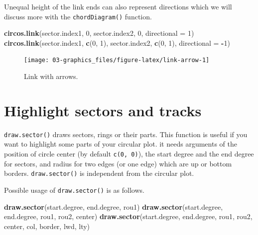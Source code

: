 \documentclass[]{book}
\newenvironment{Shaded}{\begin{snugshade}}{\end{snugshade}}
\newcommand{\KeywordTok}[1]{\textcolor[rgb]{0.13,0.29,0.53}{\textbf{#1}}}
\newcommand{\DataTypeTok}[1]{\textcolor[rgb]{0.13,0.29,0.53}{#1}}
\newcommand{\DecValTok}[1]{\textcolor[rgb]{0.00,0.00,0.81}{#1}}
\newcommand{\OperatorTok}[1]{\textcolor[rgb]{0.81,0.36,0.00}{\textbf{#1}}}
\newcommand{\NormalTok}[1]{#1}
\begin{document}
Unequal height of the link ends can also represent directions which we
will discuss more with the \texttt{chordDiagram()} function.

\begin{Shaded}
\begin{Highlighting}[]
\KeywordTok{circos.link}\NormalTok{(sector.index1, }\DecValTok{0}\NormalTok{, sector.index2, }\DecValTok{0}\NormalTok{, }\DataTypeTok{directional =} \DecValTok{1}\NormalTok{)}
\KeywordTok{circos.link}\NormalTok{(sector.index1, }\KeywordTok{c}\NormalTok{(}\DecValTok{0}\NormalTok{, }\DecValTok{1}\NormalTok{), sector.index2, }\KeywordTok{c}\NormalTok{(}\DecValTok{0}\NormalTok{, }\DecValTok{1}\NormalTok{), }\DataTypeTok{directional =} \OperatorTok{-}\DecValTok{1}\NormalTok{)}
\end{Highlighting}
\end{Shaded}

\begin{figure}

{\centering \texttt{[image: 03-graphics\_files/figure-latex/link-arrow-1]} 

}

\caption{Link with arrows.}\label{fig:link-arrow}
\end{figure}

\section{Highlight sectors and
tracks}\label{highlight-sectors-and-tracks}

\texttt{draw.sector()} draws sectors, rings or their parts. This
function is useful if you want to highlight some parts of your circular
plot. it needs arguments of the position of circle center (by default
\texttt{c(0,\ 0)}), the start degree and the end degree for sectors, and
radius for two edges (or one edge) which are up or bottom borders.
\texttt{draw.sector()} is independent from the circular plot.

Possible usage of \texttt{draw.sector()} is as follows.

\begin{Shaded}
\begin{Highlighting}[]
\KeywordTok{draw.sector}\NormalTok{(start.degree, end.degree, rou1)}
\KeywordTok{draw.sector}\NormalTok{(start.degree, end.degree, rou1, rou2, center)}
\KeywordTok{draw.sector}\NormalTok{(start.degree, end.degree, rou1, rou2, center, col, border, lwd, lty)}
\end{Highlighting}
\end{Shaded}
\end{document}
